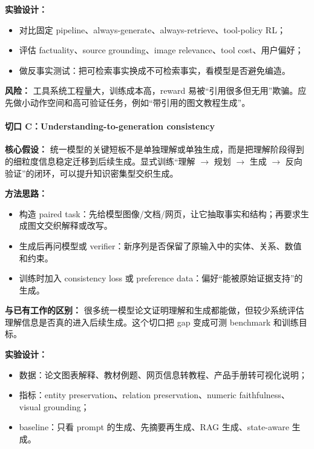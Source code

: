 \textbf{实验设计：}

\begin{itemize}[leftmargin=1.5em]
  \item 对比固定 pipeline、always-generate、always-retrieve、tool-policy RL；
  \item 评估 factuality、source grounding、image relevance、tool cost、用户偏好；
  \item 做反事实测试：把可检索事实换成不可检索事实，看模型是否避免编造。
\end{itemize}

\textbf{风险：} 工具系统工程量大，训练成本高，reward 易被“引用很多但无用”欺骗。应先做小动作空间和高可验证任务，例如“带引用的图文教程生成”。

\paragraph{切口 C：Understanding-to-generation consistency}

\textbf{核心假设：} 统一模型的关键短板不是单独理解或单独生成，而是把理解阶段得到的细粒度信息稳定迁移到后续生成。显式训练“理解 \(\rightarrow\) 规划 \(\rightarrow\) 生成 \(\rightarrow\) 反向验证”的闭环，可以提升知识密集型交织生成。

\textbf{方法思路：}

\begin{itemize}[leftmargin=1.5em]
  \item 构造 paired task：先给模型图像/文档/网页，让它抽取事实和结构；再要求生成图文交织解释或改写。
  \item 生成后再问模型或 verifier：新序列是否保留了原输入中的实体、关系、数值和约束。
  \item 训练时加入 consistency loss 或 preference data：偏好“能被原始证据支持”的生成。
\end{itemize}

\textbf{与已有工作的区别：} 很多统一模型论文证明理解和生成都能做，但较少系统评估理解信息是否真的进入后续生成。这个切口把 gap 变成可测 benchmark 和训练目标。

\textbf{实验设计：}

\begin{itemize}[leftmargin=1.5em]
  \item 数据：论文图表解释、教材例题、网页信息转教程、产品手册转可视化说明；
  \item 指标：entity preservation、relation preservation、numeric faithfulness、visual grounding；
  \item baseline：只看 prompt 的生成、先摘要再生成、RAG 生成、state-aware 生成。
\end{itemize}

